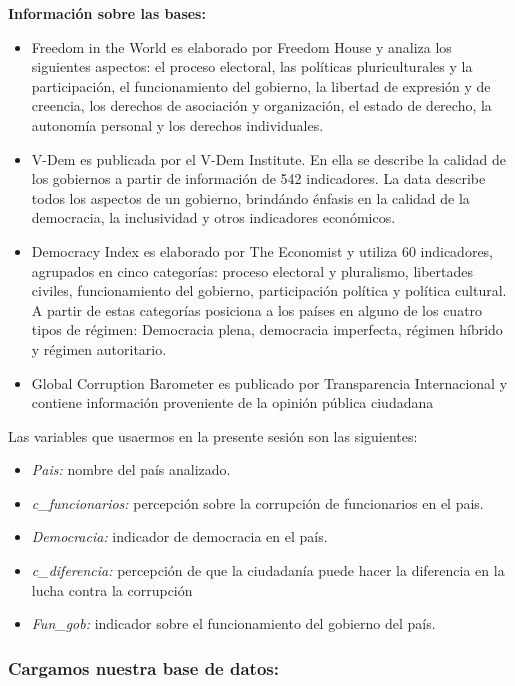 \documentclass[
]{article}
\providecommand{\tightlist}{%
  \setlength{\itemsep}{0pt}\setlength{\parskip}{0pt}}
\begin{document}
\textbf{Información sobre las bases:}

\begin{itemize}
\item
  Freedom in the World es elaborado por Freedom House y analiza los
  siguientes aspectos: el proceso electoral, las políticas
  pluriculturales y la participación, el funcionamiento del gobierno, la
  libertad de expresión y de creencia, los derechos de asociación y
  organización, el estado de derecho, la autonomía personal y los
  derechos individuales.
\item
  V-Dem es publicada por el V-Dem Institute. En ella se describe la
  calidad de los gobiernos a partir de información de 542 indicadores.
  La data describe todos los aspectos de un gobierno, brindándo énfasis
  en la calidad de la democracia, la inclusividad y otros indicadores
  económicos.
\item
  Democracy Index es elaborado por The Economist y utiliza 60
  indicadores, agrupados en cinco categorías: proceso electoral y
  pluralismo, libertades civiles, funcionamiento del gobierno,
  participación política y política cultural. A partir de estas
  categorías posiciona a los países en alguno de los cuatro tipos de
  régimen: Democracia plena, democracia imperfecta, régimen híbrido y
  régimen autoritario.
\item
  Global Corruption Barometer es publicado por Transparencia
  Internacional y contiene información proveniente de la opinión pública
  ciudadana
\end{itemize}

Las variables que usaermos en la presente sesión son las siguientes:

\begin{itemize}
\tightlist
\item
  \emph{Pais:} nombre del país analizado.
\item
  \emph{c\_funcionarios:} percepción sobre la corrupción de funcionarios
  en el pais.
\item
  \emph{Democracia:} indicador de democracia en el país.
\item
  \emph{c\_diferencia:} percepción de que la ciudadanía puede hacer la
  diferencia en la lucha contra la corrupción
\item
  \emph{Fun\_gob:} indicador sobre el funcionamiento del gobierno del
  país.
\end{itemize}

\hypertarget{cargamos-nuestra-base-de-datos}{%
\subsubsection{Cargamos nuestra base de
datos:}\label{cargamos-nuestra-base-de-datos}}
\end{document}
